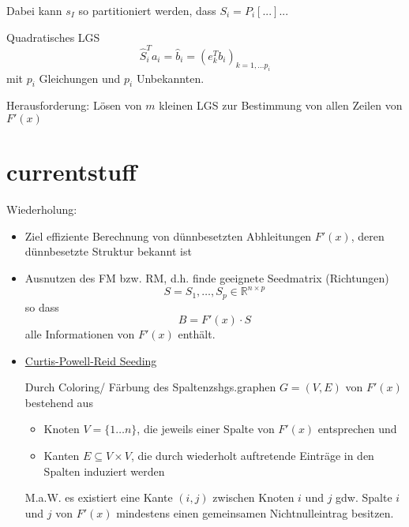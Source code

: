 Dabei kann $s_I$ so partitioniert werden, dass $S_i = P_i [...]...$

Quadratisches LGS
$$\hat{S}_i^Ta_i = \hat{b}_i = (e_k^Tb_i)_{k=1,\dots p_i}$$
mit $p_i$ Gleichungen und $p_i$ Unbekannten.

Herausforderung: Lösen von $m$ kleinen LGS zur Bestimmung von allen Zeilen von $F'(x)$\\



\noindent\makebox[\linewidth]{\rule{\paperwidth}{0.4pt}}



\noindent\makebox[\linewidth]{\rule{\paperwidth}{0.4pt}}

%

\section{currentstuff}

Wiederholung:
\begin{itemize}
	\item Ziel effiziente Berechnung von dünnbesetzten Abhleitungen $F'(x)$, deren dünnbesetzte Struktur bekannt ist
	\item  Ausnutzen des FM bzw. RM, d.h. finde geeignete Seedmatrix (Richtungen)
	$$S = S_1, \dots , S_p \in \mathbb{R}^{n\times p}$$
	so dass
	$$B=F'(x) \cdot S$$
	alle Informationen von $F'(x)$ enthält.
	\item \underline{Curtis-Powell-Reid Seeding}
	
	Durch Coloring/ Färbung des Spaltenzshgs.graphen $G=(V,E)$ von $F'(x)$ bestehend aus
	\begin{itemize}
		\item Knoten $V=\{1\dots n\}$, die jeweils einer Spalte von $F'(x)$ entsprechen und 
		\item Kanten $E\subseteq V\times V$, die durch wiederholt auftretende Einträge in den Spalten induziert werden
	\end{itemize}
	M.a.W. es existiert eine Kante $(i,j)$ zwischen Knoten $i$ und $j$ gdw. Spalte $i$ und $j$ von $F'(x)$ mindestens einen gemeinsamen Nichtnulleintrag besitzen.\\
\end{itemize}

